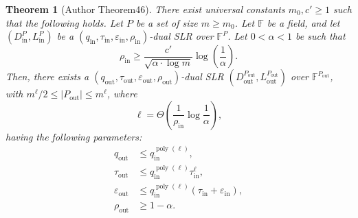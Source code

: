 \documentclass[10pt,a4paper]{article}
\newtheorem{nttheorem}{Theorem}
\begin{document}
\begin{nttheorem}[Author Theorem46]
There exist universal constants $m_0,c'\geq1$ such that the following holds. Let $P$ be a set of size $m\geq m_0$. Let $\mathbb F$ be a field, and let $(D^P_{\mathrm{in}},L^P_{\mathrm{in}})$ be a $(q_{\mathrm{in}},\tau_{\mathrm{in}},\varepsilon_{\mathrm{in}},\rho_{\mathrm{in}})$-dual SLR over $\mathbb F^P$. Let $0<\alpha<1$ be such that
\begin{equation}\rho_{\mathrm{in}}\geq\frac{c'}{\sqrt{\alpha\cdot\log m}}\log\left(\frac1\alpha\right).\tag{4.11}\end{equation}
Then, there exists a $(q_{\mathrm{out}},\tau_{\mathrm{out}},\varepsilon_{\mathrm{out}},\rho_{\mathrm{out}})$-dual SLR $(D^{P_{\mathrm{out}}}_{\mathrm{out}},L^{P_{\mathrm{out}}}_{\mathrm{out}})$ over $\mathbb F^{P_{\mathrm{out}}}$, with $m^\ell/2\leq|P_{\mathrm{out}}|\leq m^\ell$, where
\begin{equation}\ell=\Theta\left(\frac1{\rho_{\mathrm{in}}}\log\frac1\alpha\right),\tag{4.12}\end{equation}
having the following parameters:
\begin{align*}q_{\mathrm{out}}&\leq q_{\mathrm{in}}^{\operatorname{poly}(\ell)},\\\tau_{\mathrm{out}}&\leq q_{\mathrm{in}}^{\operatorname{poly}(\ell)}\tau_{\mathrm{in}}^\ell,\\\varepsilon_{\mathrm{out}}&\leq q_{\mathrm{in}}^{\operatorname{poly}(\ell)}(\tau_{\mathrm{in}}+\varepsilon_{\mathrm{in}}),\\\rho_{\mathrm{out}}&\geq1-\alpha.\end{align*}
\end{nttheorem}
\end{document}
